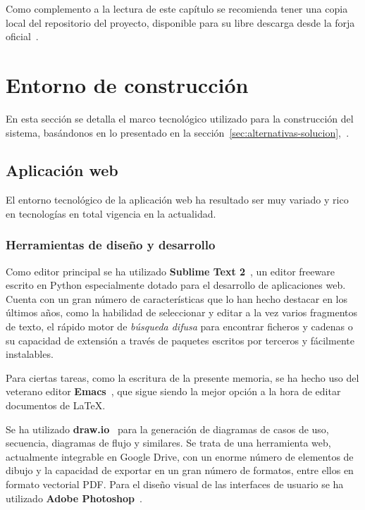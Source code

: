 Como complemento a la lectura de este capítulo se recomienda tener una copia
local del repositorio del proyecto, disponible para su libre descarga desde la
forja oficial~\cite{forja}.

\section{Entorno de construcción}

En esta sección se detalla el marco tecnológico utilizado para la construcción
del sistema, basándonos en lo presentado en la
sección~\ref{sec:alternativas-solucion},\textit{~}.

\subsection{Aplicación web}
\label{subsec:entorno-aplicacion-web}

El entorno tecnológico de la aplicación web ha resultado ser muy variado y rico
en tecnologías en total vigencia en la actualidad. 

\subsubsection{Herramientas de diseño y desarrollo}

Como editor principal se ha utilizado \textbf{Sublime Text
  2}~\cite{sublime-text}, un editor freeware escrito en Python especialmente
dotado para el desarrollo de aplicaciones web. Cuenta con un gran número de
características que lo han hecho destacar en los últimos años, como la habilidad
de seleccionar y editar a la vez varios fragmentos de texto, el rápido motor de
\textit{búsqueda difusa} para encontrar ficheros y cadenas o su capacidad de
extensión a través de paquetes escritos por terceros y fácilmente instalables.

Para ciertas tareas, como la escritura de la presente memoria, se ha hecho uso
del veterano editor \textbf{Emacs}~\cite{emacs}, que sigue siendo la mejor
opción a la hora de editar documentos de \LaTeX. 

Se ha utilizado \textbf{draw.io}~\cite{draw.io} para la generación de diagramas
de casos de uso, secuencia, diagramas de flujo y similares. Se trata de una
herramienta web, actualmente integrable en Google Drive, con un enorme número de
elementos de dibujo y la capacidad de exportar en un gran número de formatos,
entre ellos en formato vectorial \ac{PDF}. Para el diseño visual de las
interfaces de usuario se ha utilizado \textbf{Adobe Photoshop}~\cite{photoshop}.


